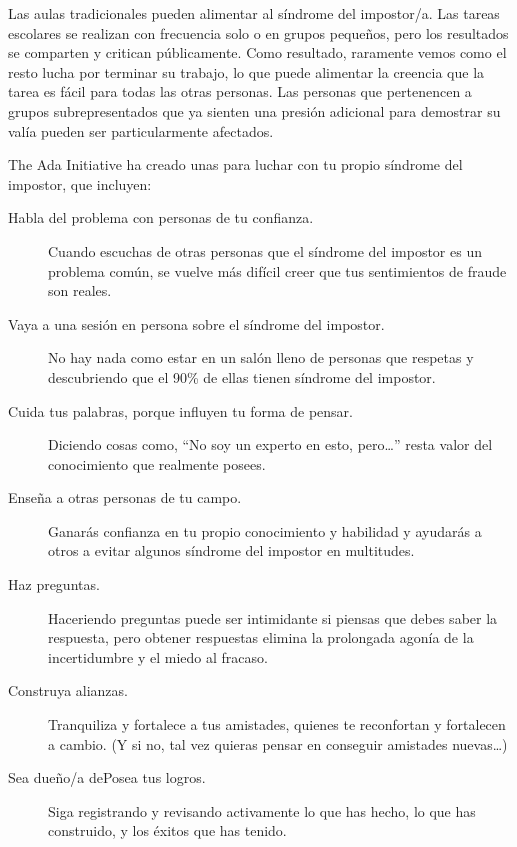 Las aulas tradicionales pueden alimentar al síndrome del impostor/a.
Las tareas escolares se realizan con frecuencia solo o en grupos pequeños,
pero los resultados se comparten y critican públicamente.
Como resultado,
raramente vemos como el resto lucha por terminar su trabajo,
lo que puede alimentar la creencia que la tarea es fácil para todas las otras personas.
Las personas que pertenencen a grupos subrepresentados que ya sienten una presión adicional para demostrar su valía
pueden ser particularmente afectados.

The Ada Initiative ha creado unas 
para luchar con tu propio síndrome del impostor,
que incluyen:

\begin{description}

\item[Habla del problema con personas de tu confianza.]
  Cuando escuchas de otras personas que el síndrome del impostor es un problema común,
  se vuelve más difícil creer que tus sentimientos de fraude son reales.

\item[Vaya a una sesión en persona sobre el síndrome del impostor.]
  No hay nada como estar en un salón lleno de personas que respetas
  y descubriendo que el 90\% de ellas tienen síndrome del impostor.

\item[Cuida tus palabras, porque influyen tu forma de pensar.]
  Diciendo cosas como,
  ``No soy un experto en esto, pero{\dots}''
  resta valor del conocimiento que realmente posees.

\item[Enseña a otras personas de tu campo.]
  Ganarás confianza en tu propio conocimiento y habilidad
  y ayudarás a otros a evitar algunos síndrome del impostor en multitudes.

\item[Haz preguntas.]
    Haceriendo preguntas puede ser intimidante si piensas que debes saber la respuesta,
    pero obtener respuestas elimina la prolongada agonía de la incertidumbre y el miedo al fracaso.

\item[Construya alianzas.]
  Tranquiliza y fortalece a tus amistades,
  quienes te reconfortan y fortalecen a cambio.
  (Y si no, tal vez quieras pensar en conseguir amistades nuevas{\ldots})

\item[Sea dueño/a dePosea tus logros.]
  Siga registrando y revisando activamente lo que has hecho,
  lo que has construido,
  y los éxitos que has tenido.

\end{description}

